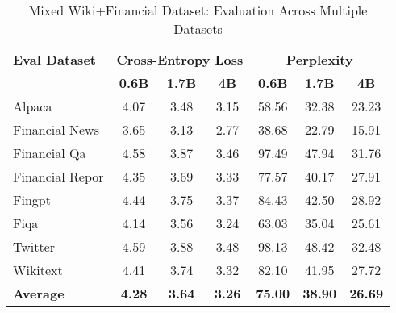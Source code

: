 
\begin{table}[h]
\centering
\caption[Mixed Wiki+Financial: Evaluation Results]{Mixed Wiki+Financial Dataset: Evaluation Across Multiple Datasets}
\label{tab:mixed_wiki_financial_results}
\begin{tabular}{l|ccc|ccc}
\hline
\textbf{Eval Dataset} & \multicolumn{3}{c|}{\textbf{Cross-Entropy Loss}} & \multicolumn{3}{c}{\textbf{Perplexity}} \\
\cline{2-4} \cline{5-7}
  & \textbf{0.6B} & \textbf{1.7B} & \textbf{4B} & \textbf{0.6B} & \textbf{1.7B} & \textbf{4B} \\
Alpaca & 4.07 & 3.48 & 3.15 & 58.56 & 32.38 & 23.23 \\
Financial News & 3.65 & 3.13 & 2.77 & 38.68 & 22.79 & 15.91 \\
Financial Qa & 4.58 & 3.87 & 3.46 & 97.49 & 47.94 & 31.76 \\
Financial Repor & 4.35 & 3.69 & 3.33 & 77.57 & 40.17 & 27.91 \\
Fingpt & 4.44 & 3.75 & 3.37 & 84.43 & 42.50 & 28.92 \\
Fiqa & 4.14 & 3.56 & 3.24 & 63.03 & 35.04 & 25.61 \\
Twitter & 4.59 & 3.88 & 3.48 & 98.13 & 48.42 & 32.48 \\
Wikitext & 4.41 & 3.74 & 3.32 & 82.10 & 41.95 & 27.72 \\
\hline
\textbf{Average} & \textbf{4.28} & \textbf{3.64} & \textbf{3.26} & \textbf{75.00} & \textbf{38.90} & \textbf{26.69} \\
\hline
\end{tabular}
\end{table}

